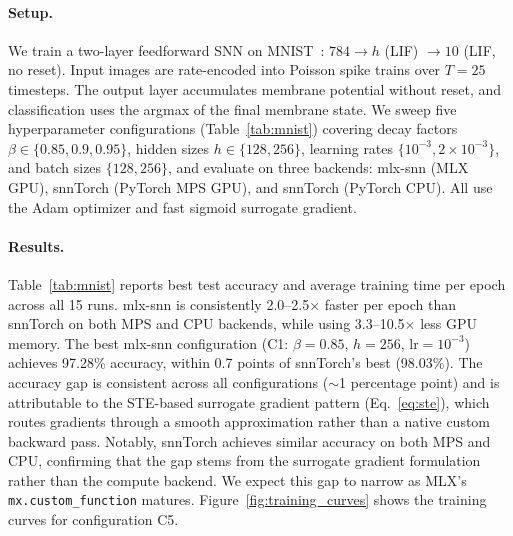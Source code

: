 \documentclass[11pt]{article}
\begin{document}
\paragraph{Setup.}
We train a two-layer feedforward SNN on MNIST~\citep{lecun1998gradient}: $784 \rightarrow h$ (LIF) $\rightarrow 10$ (LIF, no reset). Input images are rate-encoded into Poisson spike trains over $T=25$ timesteps. The output layer accumulates membrane potential without reset, and classification uses the argmax of the final membrane state. We sweep five hyperparameter configurations (Table~\ref{tab:mnist}) covering decay factors $\beta \in \{0.85, 0.9, 0.95\}$, hidden sizes $h \in \{128, 256\}$, learning rates $\{10^{-3}, 2{\times}10^{-3}\}$, and batch sizes $\{128, 256\}$, and evaluate on three backends: mlx-snn (MLX GPU), snnTorch (PyTorch MPS GPU), and snnTorch (PyTorch CPU). All use the Adam optimizer and fast sigmoid surrogate gradient.

\paragraph{Results.}
Table~\ref{tab:mnist} reports best test accuracy and average training time per epoch across all 15 runs. mlx-snn is consistently 2.0--2.5$\times$ faster per epoch than snnTorch on both MPS and CPU backends, while using 3.3--10.5$\times$ less GPU memory. The best mlx-snn configuration (C1: $\beta{=}0.85$, $h{=}256$, lr$=10^{-3}$) achieves 97.28\% accuracy, within 0.7 points of snnTorch's best (98.03\%). The accuracy gap is consistent across all configurations (${\sim}$1 percentage point) and is attributable to the STE-based surrogate gradient pattern (Eq.~\ref{eq:ste}), which routes gradients through a smooth approximation rather than a native custom backward pass. Notably, snnTorch achieves similar accuracy on both MPS and CPU, confirming that the gap stems from the surrogate gradient formulation rather than the compute backend. We expect this gap to narrow as MLX's \texttt{mx.custom\_function} matures. Figure~\ref{fig:training_curves} shows the training curves for configuration C5.
\end{document}
